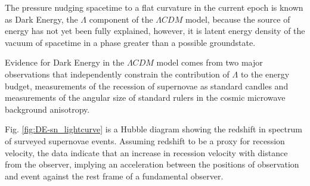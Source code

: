 \documentclass{paper}
\begin{document}
  The pressure nudging spacetime to a flat curvature in the current epoch is 
  known as Dark Energy, the \(\Lambda\) component of the \(\Lambda CDM\)
  model, because the source of energy has not yet been fully explained, 
  however, it is latent energy density of the vacuum of spacetime in a phase
  greater than a possible groundstate.

  Evidence for Dark Energy in the \(\Lambda CDM\) model comes from two major
  observations that independently constrain the contribution of \(\Lambda\) 
  to the energy budget, measurements of the recession of supernovae as 
  standard candles and measurements of the angular size of standard rulers in 
  the cosmic microwave background anisotropy.

  Fig. \ref{fig:DE-sn_lightcurve} is a Hubble diagram showing the redshift in
  spectrum of surveyed supernovae events. Assuming redshift to be a proxy for
  recession velocity, the data indicate that an increase in recession 
  velocity with distance from the observer, implying an acceleration between
  the positions of observation and event against the rest frame of a
  fundamental observer.
\end{document}
